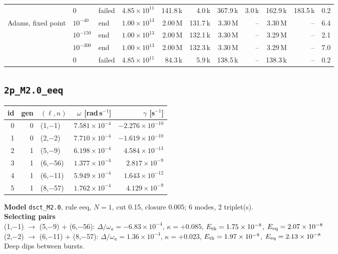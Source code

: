 {\begin{tabular}{@{}llllrrrrrrr@{}}
 & $0$ & failed & $4.85\times10^{11}$ & 141.8\,k & 4.0\,k & 367.9\,k & 3.0\,k & 162.9\,k & 183.5\,k & 0.2 \\
\addlinespace[2pt]
Adams, fixed point & $10^{-40}$ & end & $1.00\times10^{13}$ & 2.00\,M & 131.7\,k & 3.30\,M & -- & 3.30\,M & -- & 6.4 \\
 & $10^{-150}$ & end & $1.00\times10^{13}$ & 2.00\,M & 132.1\,k & 3.30\,M & -- & 3.29\,M & -- & 2.1 \\
 & $10^{-300}$ & end & $1.00\times10^{13}$ & 2.00\,M & 132.3\,k & 3.30\,M & -- & 3.29\,M & -- & 7.0 \\
 & $0$ & failed & $4.85\times10^{11}$ & 84.3\,k & 5.9\,k & 138.5\,k & -- & 138.3\,k & -- & 0.2 \\
\bottomrule
\end{tabular}}

\clearpage
\subsection{\texttt{2p\_M2.0\_eeq}}\label{net:2p_M2.0_eeq}
\noindent\begin{minipage}[t]{0.43\textwidth}\vspace{0pt}\footnotesize
\begin{tabular}{@{}rrlrr@{}}
\toprule
id & gen & $(\ell,n)$ & $\omega$ [rad\,s$^{-1}$] & $\gamma$ [s$^{-1}$] \\
\midrule
0 & 0 & (1,$-$1) & $7.581\times10^{-4}$ & $-2.276\times10^{-10}$ \\
1 & 0 & (2,$-$2) & $7.710\times10^{-4}$ & $-1.619\times10^{-10}$ \\
2 & 1 & (5,$-$9) & $6.198\times10^{-4}$ & $4.584\times10^{-13}$ \\
3 & 1 & (6,$-$56) & $1.377\times10^{-4}$ & $2.817\times10^{-9}$ \\
4 & 1 & (6,$-$11) & $5.949\times10^{-4}$ & $1.643\times10^{-12}$ \\
5 & 1 & (8,$-$57) & $1.762\times10^{-4}$ & $4.129\times10^{-9}$ \\
\bottomrule
\end{tabular}
\end{minipage}\hfill
\begin{minipage}[t]{0.55\textwidth}\vspace{0pt}\footnotesize
\textbf{Model} \texttt{dsct\_M2.0}, rule eeq, $N=1$, cut 0.15,
closure 0.005; 6 modes, 2 triplet(s).\\[2pt]
\textbf{Selecting pairs}\\ (1,$-$1) $\to$ (5,$-$9) + (6,$-$56): $\Delta/\omega_a=-6.83\times10^{-4}$, $\kappa=+0.085$, $E_{\rm th}=1.75\times10^{-8}$, $E_{\rm eq}=2.07\times10^{-8}$\\
(2,$-$2) $\to$ (6,$-$11) + (8,$-$57): $\Delta/\omega_a=1.36\times10^{-4}$, $\kappa=+0.023$, $E_{\rm th}=1.97\times10^{-8}$, $E_{\rm eq}=2.13\times10^{-8}$\\[2pt]
Deep dips between bursts.
\end{minipage}

